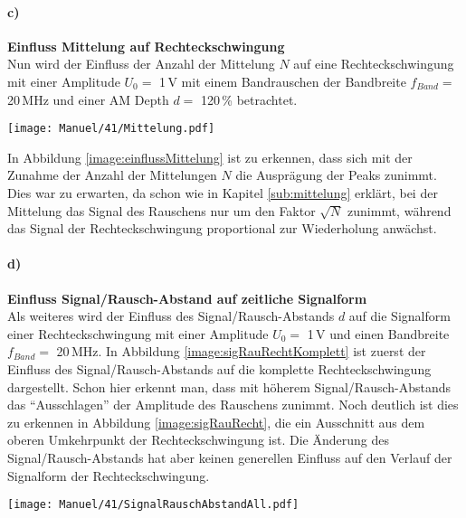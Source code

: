 \paragraph{c)}\textbf{Einfluss Mittelung auf Rechteckschwingung}\\
Nun wird der Einfluss der Anzahl der Mittelung $N$ auf eine Rechteckschwingung mit einer Amplitude $U_0=$ 1\,V mit einem Bandrauschen der Bandbreite $f_{Band}=$ 20\,MHz und einer AM Depth $d =$ 120\,\% betrachtet.
\begin{center}
    \texttt{[image: Manuel/41/Mittelung.pdf]}
    \label{image:einflussMittelung}
\end{center}
In Abbildung \ref{image:einflussMittelung} ist zu erkennen, dass sich mit der Zunahme der Anzahl der Mittelungen $N$ die Ausprägung der Peaks zunimmt. Dies war zu erwarten, da schon wie in Kapitel \ref{sub:mittelung} erklärt, bei der Mittelung das Signal des Rauschens nur um den Faktor $\sqrt{N}$ zunimmt, während das Signal der Rechteckschwingung proportional zur Wiederholung anwächst.


\newpage
\paragraph{d)}\textbf{Einfluss Signal/Rausch-Abstand auf zeitliche Signalform}\\
Als weiteres wird der Einfluss des Signal/Rausch-Abstands $d$ auf die Signalform einer Rechteckschwingung mit einer Amplitude $U_0=$ 1\,V und einen Bandbreite\\$f_{Band}=$ 20\,MHz.
In Abbildung \ref{image:sigRauRechtKomplett} ist zuerst der Einfluss des Signal/Rausch-Abstands auf die komplette Rechteckschwingung dargestellt. Schon hier erkennt man, dass mit höherem Signal/Rausch-Abstands das \enquote{Ausschlagen} der Amplitude des Rauschens zunimmt. Noch deutlich ist dies zu erkennen in Abbildung \ref{image:sigRauRecht}, die ein Ausschnitt aus dem oberen Umkehrpunkt der Rechteckschwingung ist. Die Änderung des Signal/Rausch-Abstands hat aber keinen generellen Einfluss auf den Verlauf der Signalform der Rechteckschwingung.
\begin{center}
    \texttt{[image: Manuel/41/SignalRauschAbstandAll.pdf]}
    \label{image:sigRauRecht}
\end{center}
\newpage



